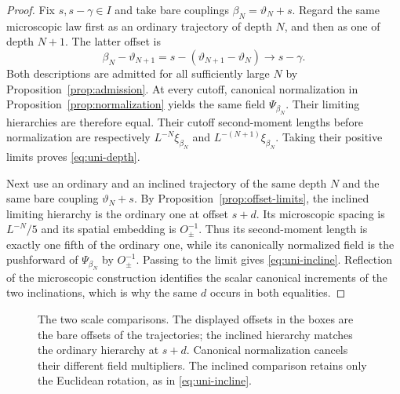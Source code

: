 \begin{proof}
Fix $s,s-\gamma\in I$ and take bare couplings
$\beta_N=\vartheta_N+s$.  Regard the same microscopic law first as an
ordinary trajectory of depth $N$, and then as one of depth $N+1$.
The latter offset is
\[
 \beta_N-\vartheta_{N+1}
 =s-(\vartheta_{N+1}-\vartheta_N)\longrightarrow s-\gamma.
\]
Both descriptions are admitted for all sufficiently large $N$ by
Proposition~\ref{prop:admission}.  At every cutoff, canonical
normalization in Proposition~\ref{prop:normalization} yields the same
field $\Psi_{\beta_N}$.  Their limiting hierarchies are therefore equal.
Their cutoff second-moment lengths before normalization are respectively
$L^{-N}\xi_{\beta_N}$ and $L^{-(N+1)}\xi_{\beta_N}$.  Taking their
positive limits proves \eqref{eq:uni-depth}.

Next use an ordinary and an inclined trajectory of the same depth $N$
and the same bare coupling $\vartheta_N+s$.  By
Proposition~\ref{prop:offset-limits}, the inclined limiting hierarchy
is the ordinary one at offset $s+d$.  Its microscopic spacing is
$L^{-N}/5$ and its spatial embedding is $O_\pm^{-1}$.
Thus its second-moment length is exactly one fifth of the ordinary
one, while its canonically normalized field is the pushforward of
$\Psi_{\beta_N}$ by $O_\pm^{-1}$.  Passing to the limit gives
\eqref{eq:uni-incline}.  Reflection of the microscopic construction
identifies the scalar canonical increments of the two inclinations,
which is why the same $d$ occurs in both equalities.
\end{proof}

\begin{figure}[tb]
\centering
{}
\caption{The two scale comparisons.  The displayed offsets in the boxes
are the bare offsets of the trajectories; the inclined hierarchy matches
the ordinary hierarchy at $s+d$.  Canonical normalization cancels their
different field multipliers.  The inclined comparison retains only the
Euclidean rotation, as in \eqref{eq:uni-incline}.}
\label{fig:two-scales}
\end{figure}

